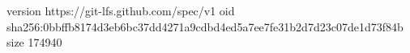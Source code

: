 version https://git-lfs.github.com/spec/v1
oid sha256:0bbffb8174d3eb6bc37dd4271a9cdbd4ed5a7ee7fe31b2d7d23c07de1d73f84b
size 174940
